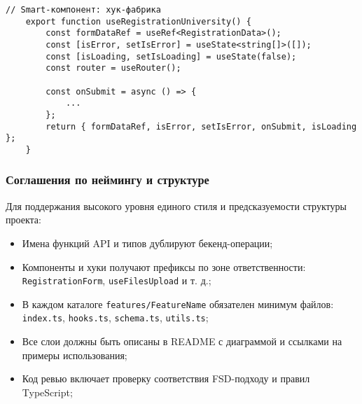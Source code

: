\begin{lstlisting}[breaklines=true,caption=useRegistrationUniversity]
	// Smart-компонент: хук-фабрика
	export function useRegistrationUniversity() {
		const formDataRef = useRef<RegistrationData>();
		const [isError, setIsError] = useState<string[]>([]);
		const [isLoading, setIsLoading] = useState(false);
		const router = useRouter();
		
		const onSubmit = async () => {
			...
		};
		return { formDataRef, isError, setIsError, onSubmit, isLoading };
	}
\end{lstlisting}

\subsubsection{Соглашения по неймингу и структуре}

Для поддержания высокого уровня единого стиля и предсказуемости структуры проекта:

\begin{itemize}
	\item Имена функций API и типов дублируют бекенд-операции;
	\item Компоненты и хуки получают префиксы по зоне ответственности: \texttt{RegistrationForm}, \texttt{useFilesUpload} и т. д.;
	\item В каждом каталоге \texttt{features/FeatureName} обязателен минимум файлов: \texttt{index.ts}, \texttt{hooks.ts}, \texttt{schema.ts}, \texttt{utils.ts};
	\item Все слои должны быть описаны в README с диаграммой и ссылками на примеры использования;
	\item Код ревью включает проверку соответствия FSD-подходу и правил TypeScript;
\end{itemize}
